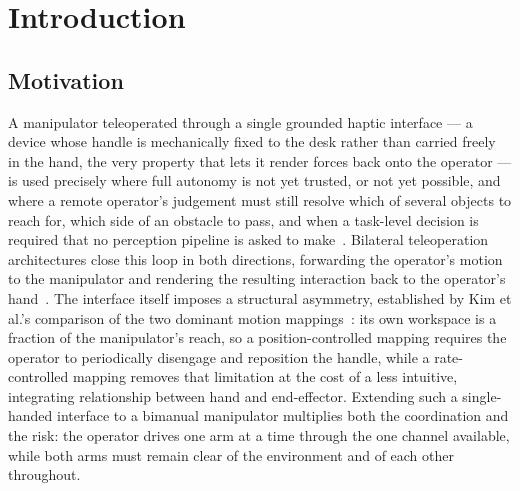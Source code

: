 \chapter{Introduction}
\label{ch:intro}

\section{Motivation}
\label{sec:motivation}

A manipulator teleoperated through a single grounded haptic interface --- a device whose handle is mechanically fixed to the desk rather than carried freely in the hand, the very property that lets it render forces back onto the operator --- is used precisely where full autonomy is not yet trusted, or not yet possible, and where a remote operator's judgement must still resolve which of several objects to reach for, which side of an obstacle to pass, and when a task-level decision is required that no perception pipeline is asked to make~\cite{jain2020probabilistic}. Bilateral teleoperation architectures close this loop in both directions, forwarding the operator's motion to the manipulator and rendering the resulting interaction back to the operator's hand~\cite{hokayem2006bilateral}. The interface itself imposes a structural asymmetry, established by Kim et al.'s comparison of the two dominant motion mappings~\cite{kim1987comparison}: its own workspace is a fraction of the manipulator's reach, so a position-controlled mapping requires the operator to periodically disengage and reposition the handle, while a rate-controlled mapping removes that limitation at the cost of a less intuitive, integrating relationship between hand and end-effector. Extending such a single-handed interface to a bimanual manipulator multiplies both the coordination and the risk: the operator drives one arm at a time through the one channel available, while both arms must remain clear of the environment and of each other throughout.

